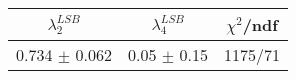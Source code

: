 \begin{tabular}{c|c||c}
$\lambda_{2}^{LSB}$ & $\lambda_4^{LSB}$ & $\chi^{2}$/ndf \\
\hline
0.734 $\pm$ 0.062 & 0.05 $\pm$ 0.15 & 1175/71\\
\end{tabular}
